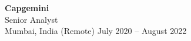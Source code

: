 \documentclass[11pt]{article}
\begin{document}
\textbf{Capgemini} \\
Senior Analyst \\
Mumbai, India (Remote) \hfill July 2020 -- August 2022
\begin{itemize}[leftmargin=15pt,itemsep=-6pt]



\end{itemize}
\end{document}
